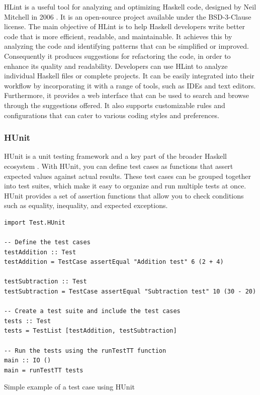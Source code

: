 \documentclass[a4paper, titlepage, twoside]{article}
\begin{document}
HLint is a useful tool for analyzing and optimizing Haskell code, designed by Neil Mitchell in 2006 \autocite{mitchellHLint2023}. It is an open-source project available under the BSD-3-Clause license. The main objective of HLint is to help Haskell developers write better code that is more efficient, readable, and maintainable. It achieves this by analyzing the code and identifying patterns that can be simplified or improved. Consequently it produces suggestions for refactoring the code, in order to enhance its quality and readability. Developers can use HLint to analyze individual Haskell files or complete projects. It can be easily integrated into their workflow by incorporating it with a range of tools, such as IDEs and text editors. Furthermore, it provides a web interface that can be used to search and browse through the suggestions offered. It also supports customizable rules and configurations that can cater to various coding styles and preferences.

\subsubsection{HUnit}
\label{sec:orga037ad0}

HUnit is a unit testing framework and a key part of the broader Haskell ecosystem \autocite{HUnitUserGuide2023}. With HUnit, you can define test cases as functions that assert expected values against actual results. These test cases can be grouped together into test suites, which make it easy to organize and run multiple tests at once. HUnit provides a set of assertion functions that allow you to check conditions such as equality, inequality, and expected exceptions.

\begin{listing}[htbp]
\begin{verbatim}
import Test.HUnit

-- Define the test cases
testAddition :: Test
testAddition = TestCase assertEqual "Addition test" 6 (2 + 4)

testSubtraction :: Test
testSubtraction = TestCase assertEqual "Subtraction test" 10 (30 - 20)

-- Create a test suite and include the test cases
tests :: Test
tests = TestList [testAddition, testSubtraction]

-- Run the tests using the runTestTT function
main :: IO ()
main = runTestTT tests
\end{verbatim}
\caption{\label{lst:orgac15733}Simple example of a test case using HUnit}
\end{listing}
\end{document}
